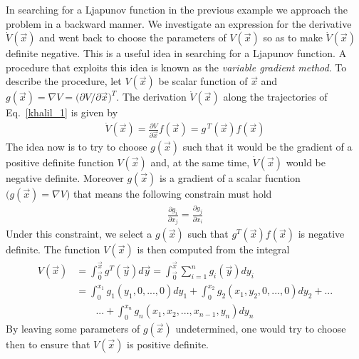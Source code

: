 \documentclass[11pt,a4paper,oneside]{book}
\numberwithin{equation}{section}
\theoremstyle{it}
\theoremstyle{definition}
\begin{document}
In searching for a Ljapunov function in the previous example we approach the 
problem in a backward manner. We investigate an expression for the derivative 
$\dot{V}(\vec{x})$ and went back to choose the parameters of $V(\vec{x})$ so as 
to make $\dot{V}(\vec{x})$ definite negative. This is a useful idea in 
searching for a Ljapunov function. A procedure that exploits this idea is known 
as the \textit{variable gradient method}. To describe the procedure, let 
$V(\vec{x})$ be scalar function of $\vec{x}$ and $g(\vec{x})=\nabla 
V=\big(\partial V/\partial \vec{x}\big)^T$. The derivation $\dot{V}(\vec{x})$ 
along the trajectories of Eq.~\eqref{khalil_1} is given by
\begin{equation*}
	\begin{aligned}
		\dot{V}(\vec{x})=\frac{\partial V}{\partial 
		\vec{x}}f(\vec{x})=g^{\,T}(\vec{x})f(\vec{x})
	\end{aligned}
\end{equation*}
The idea now is to try to choose $g(\vec{x})$ such that it would be the 
gradient of a positive definite function $V(\vec{x})$ and, at the same time, 
$\dot{V}(\vec{x})$ would be negative definite. Moreover $g(\vec{x})$ is a 
gradient of a scalar fucntion $\big(g(\vec{x})=\nabla V\big)$ that means the 
following constrain must hold
\begin{equation*}
	\begin{aligned}
		\frac{\partial g_i}{\partial x_j} = \frac{\partial g_j}{\partial x_i}
	\end{aligned}
\end{equation*}
Under this constraint, we select a $g(\vec{x})$ such that 
$g^T(\vec{x})f(\vec{x})$ is negative definite. The function $V(\vec{x})$ is 
then computed from the integral
\begin{equation*}
	\begin{aligned}
		V(\vec{x})&=\int_{\vec{0}}^{\vec{x}}g^T(\vec{y})d\vec{y} = 
		\int_{\vec{0}}^{\vec{x}}\sum_{i=1}^{n}g_i(\vec{y})dy_i \\[6pt]
		&=\int_{0}^{x_1}g_1(y_1,0,...,0)dy_1+\int_{0}^{x_2} 
		g_2(x_1,y_2,0,...,0) dy_2 + ...\\[6pt]
		&\qquad ...+\int_{0}^{x_n}g_n(x_1,x_2,...,x_{n-1},y_n)dy_n
	\end{aligned}
\end{equation*}
By leaving some parameters of $g(\vec{x})$ undetermined, one would try to 
choose then to ensure that $V(\vec{x})$ is positive definite. 
\end{document}
